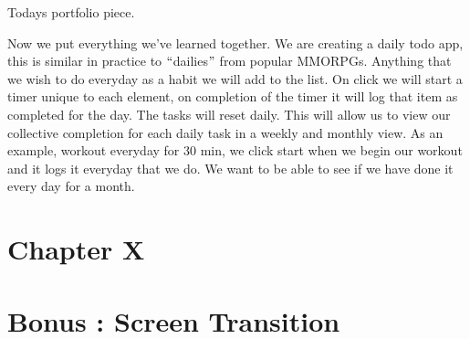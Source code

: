 \documentclass[12pt]{report}
\begin{document}


\vspace{\baselineskip}
Todays portfolio piece. \par


\vspace{\baselineskip}
Now we put everything we’ve learned together. We are creating a daily todo app, this is similar in practice to $``$dailies$"$  from popular MMORPGs. Anything that we wish to do everyday as a habit we will add to the list. On click we will start a timer unique to each element, on completion of the timer it will log that item as completed for the day. The tasks will reset daily. This will allow us to view our collective completion for each daily task in a weekly and monthly view. As an example, workout everyday for 30 min, we click start when we begin our workout and it logs it everyday that we do. We want to be able to see if we have done it every day for a month. \par


\vspace{\baselineskip}

\vspace{\baselineskip}

\vspace{\baselineskip}



\newpage

\vspace{\baselineskip}
\vspace{\baselineskip}

\vspace{\baselineskip}

\vspace{\baselineskip}
\section*{Chapter X}
\section*{Bonus : Screen Transition}

\vspace{\baselineskip}

\vspace{\baselineskip}
\end{document}
